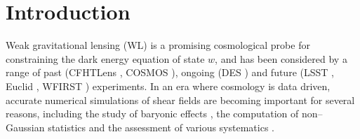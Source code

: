 \documentclass[reprint,aps,prd,superscriptaddress,showkeys,showpacs]{revtex4-1}
\begin{document}

\maketitle



\section{Introduction}
%
Weak gravitational lensing (WL) is a promising cosmological probe for
constraining the dark energy equation of state $w$, and has been
considered by a range of past (CFHTLens \citep{cfht1,cfht2}, COSMOS \citep{cosmos}),
ongoing (DES \citep{DES}) and future (LSST \citep{LSST}, Euclid \citep{Euclid}, WFIRST \citep{WFIRST})
experiments. In an era where cosmology is data driven, accurate
numerical simulations of shear fields are becoming important for
several reasons, including the study of baryonic effects
\citep{BaryonXiuyuan,BaryonSemboloni,BaryonsWhite,BaryonsKnox,BaryonsZentner1,BaryonsZentner2}, 
the computation of non--Gaussian statistics
\citep{PeaksJan,MinkJan,MinkPetri,NG-Marian,NG-Jain1,NG-Jain2,NG-Jain3,NG-Refregier,NG-Dietrich} 
and the  assessment of various systematics
\citep{MinkShirasaki,Sys-Bard,Sys-Chang,Sys-Huterer}.
\end{document}

